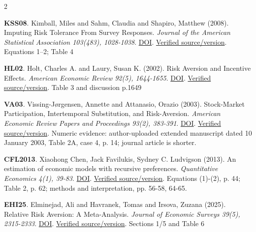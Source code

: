 \documentclass[10pt,a4paper,landscape]{article}
\begin{document}
\begin{multicols}{2}
\begin{minipage}{\linewidth}\hypertarget{ref:KSS08}{}\textbf{KSS08}. Kimball, Miles and Sahm, Claudia and Shapiro, Matthew (2008). Imputing Risk Tolerance From Survey Responses. \emph{Journal of the American Statistical Association 103(483), 1028-1038}. \href{https://doi.org/10.1198/016214508000000139}{DOI}. \href{https://pmc.ncbi.nlm.nih.gov/articles/PMC2856097/}{Verified source/version}. Equations 1--2; Table 4\end{minipage}\par
\begin{minipage}{\linewidth}\hypertarget{ref:HL02}{}\textbf{HL02}. Holt, Charles A. and Laury, Susan K. (2002). Risk Aversion and Incentive Effects. \emph{American Economic Review 92(5), 1644-1655}. \href{https://doi.org/10.1257/000282802762024700}{DOI}. \href{https://lorko.sk/wp-content/uploads/2023/10/HoltLaury2002.pdf}{Verified source/version}. Table 3 and discussion p.1649\end{minipage}\par
\begin{minipage}{\linewidth}\hypertarget{ref:VA03}{}\textbf{VA03}. Vissing-Jørgensen, Annette and Attanasio, Orazio (2003). Stock-Market Participation, Intertemporal Substitution, and Risk-Aversion. \emph{American Economic Review Papers and Proceedings 93(2), 383-391}. \href{https://doi.org/10.1257/000282803321947399}{DOI}. \href{https://www.researchgate.net/publication/4981014_Stock-Market_Participation_Intertemporal_Substitution_and_Risk-Aversion}{Verified source/version}. Numeric evidence: author-uploaded extended manuscript dated 10 January 2003, Table 2A, case 4, p. 14; journal article is shorter.\end{minipage}\par
\begin{minipage}{\linewidth}\hypertarget{ref:CFL2013}{}\textbf{CFL2013}. Xiaohong Chen, Jack Favilukis, Sydney C. Ludvigson (2013). An estimation of economic models with recursive preferences. \emph{Quantitative Economics 4(1), 39-83}. \href{https://doi.org/10.3982/QE97}{DOI}. \href{https://www.econstor.eu/bitstream/10419/150343/1/v4-i1-p039-083-QE97.pdf}{Verified source/version}. Equations (1)-(2), p. 44; Table 2, p. 62; methods and interpretation, pp. 56-58, 64-65.\end{minipage}\par
\begin{minipage}{\linewidth}\hypertarget{ref:EHI25}{}\textbf{EHI25}. Elminejad, Ali and Havranek, Tomas and Irsova, Zuzana (2025). Relative Risk Aversion: A Meta-Analysis. \emph{Journal of Economic Surveys 39(5), 2315-2333}. \href{https://doi.org/10.1111/joes.12689}{DOI}. \href{https://onlinelibrary.wiley.com/doi/full/10.1111/joes.12689}{Verified source/version}. Sections 1/5 and Table 6\end{minipage}\par

\end{multicols}
\end{document}

